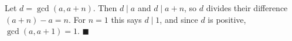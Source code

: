 Let $d=\gcd(a,a+n)$. Then $d\mid a$ and $d\mid a+n$, so $d$ divides their difference $(a+n)-a=n$. For $n=1$ this says $d\mid1$, and since $d$ is positive, $\gcd(a,a+1)=1$. $\blacksquare$

